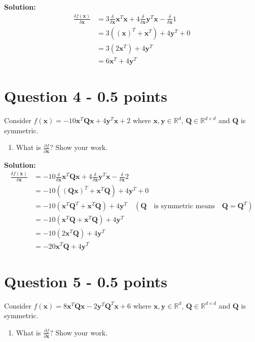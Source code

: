 \documentclass[11pt]{article}
\begin{document}
\textbf{Solution:}
\begin{align*}
\frac{\delta f(\mathbf{x})}{\delta \mathbf{x}} &= 3\frac{\delta}{\delta \mathbf{x}} \mathbf{x}^T\mathbf{x}  + 4 \frac{\delta}{\delta \mathbf{x}} \mathbf{y}^T\mathbf{x} - \frac{\delta}{\delta \mathbf{x}} 1\\
&= 3((\mathbf{x})^T + \mathbf{x}^T)  + 4 \mathbf{y}^T + 0\\
&= 3(2\mathbf{x}^T)  + 4 \mathbf{y}^T\\
&= 6\mathbf{x}^T  + 4 \mathbf{y}^T
\end{align*}

\section*{Question 4 - 0.5 points}
Consider $f(\mathbf{x}) = -10\mathbf{x}^T\mathbf{Q}\mathbf{x} + 4\mathbf{y}^T\mathbf{x} + 2$ where $\mathbf{x}, \mathbf{y} \in \mathbb{R}^d$, $\mathbf{Q} \in \mathbb{R}^{d\times d}$ and $\mathbf{Q}$ is symmetric.
 \begin{enumerate} 
\item What is $\frac{\partial f}{\partial\mathbf{x}}$?  Show your work. 
\end{enumerate}

\textbf{Solution:}
\begin{align*}
\frac{\delta f(\mathbf{x})}{\delta \mathbf{x}} &= -10\frac{\delta}{\delta \mathbf{x}} \mathbf{x}^T\mathbf{Q}\mathbf{x}  + 4 \frac{\delta}{\delta \mathbf{x}} \mathbf{y}^T\mathbf{x} - \frac{\delta}{\delta \mathbf{x}} 2 \\
&= -10((\mathbf{Q}\mathbf{x})^T + \mathbf{x}^T\mathbf{Q})  + 4 \mathbf{y}^T + 0 \\
&= -10(\mathbf{x}^T\mathbf{Q}^T + \mathbf{x}^T\mathbf{Q})  + 4 \mathbf{y}^T \quad (\mathbf{Q}\quad\textrm{is symmetric means} \quad \mathbf{Q} = \mathbf{Q}^T )\\
&= -10(\mathbf{x}^T\mathbf{Q} + \mathbf{x}^T\mathbf{Q})  + 4 \mathbf{y}^T\\
&= -10(2\mathbf{x}^T\mathbf{Q})  + 4 \mathbf{y}^T\\
&= -20\mathbf{x}^T\mathbf{Q}  + 4 \mathbf{y}^T
\end{align*}

\section*{Question 5 - 0.5 points}
Consider $f(\mathbf{x}) = 8\mathbf{x}^T\mathbf{Q}\mathbf{x} - 2\mathbf{y}^T\mathbf{Q}^T\mathbf{x} + 6$ where $\mathbf{x}, \mathbf{y} \in \mathbb{R}^d$, $\mathbf{Q} \in \mathbb{R}^{d\times d}$ and $\mathbf{Q}$ is symmetric.
\begin{enumerate} 
\item What is $\frac{\partial f}{\partial\mathbf{x}}$?  Show your work.
\end{enumerate}
\end{document}

